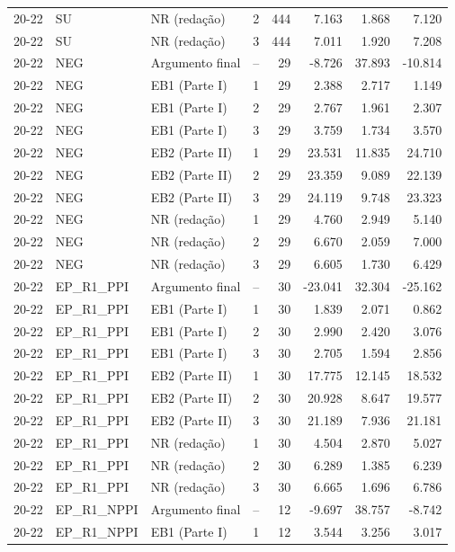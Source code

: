 \begin{longtable}{lllcrrrr}
20-22 & SU & NR (redação) & 2 & 444 & 7.163 & 1.868 & 7.120 \\
20-22 & SU & NR (redação) & 3 & 444 & 7.011 & 1.920 & 7.208 \\
20-22 & NEG & Argumento final & -- & 29 & -8.726 & 37.893 & -10.814 \\
20-22 & NEG & EB1 (Parte I) & 1 & 29 & 2.388 & 2.717 & 1.149 \\
20-22 & NEG & EB1 (Parte I) & 2 & 29 & 2.767 & 1.961 & 2.307 \\
20-22 & NEG & EB1 (Parte I) & 3 & 29 & 3.759 & 1.734 & 3.570 \\
20-22 & NEG & EB2 (Parte II) & 1 & 29 & 23.531 & 11.835 & 24.710 \\
20-22 & NEG & EB2 (Parte II) & 2 & 29 & 23.359 & 9.089 & 22.139 \\
20-22 & NEG & EB2 (Parte II) & 3 & 29 & 24.119 & 9.748 & 23.323 \\
20-22 & NEG & NR (redação) & 1 & 29 & 4.760 & 2.949 & 5.140 \\
20-22 & NEG & NR (redação) & 2 & 29 & 6.670 & 2.059 & 7.000 \\
20-22 & NEG & NR (redação) & 3 & 29 & 6.605 & 1.730 & 6.429 \\
20-22 & EP\_R1\_PPI & Argumento final & -- & 30 & -23.041 & 32.304 & -25.162 \\
20-22 & EP\_R1\_PPI & EB1 (Parte I) & 1 & 30 & 1.839 & 2.071 & 0.862 \\
20-22 & EP\_R1\_PPI & EB1 (Parte I) & 2 & 30 & 2.990 & 2.420 & 3.076 \\
20-22 & EP\_R1\_PPI & EB1 (Parte I) & 3 & 30 & 2.705 & 1.594 & 2.856 \\
20-22 & EP\_R1\_PPI & EB2 (Parte II) & 1 & 30 & 17.775 & 12.145 & 18.532 \\
20-22 & EP\_R1\_PPI & EB2 (Parte II) & 2 & 30 & 20.928 & 8.647 & 19.577 \\
20-22 & EP\_R1\_PPI & EB2 (Parte II) & 3 & 30 & 21.189 & 7.936 & 21.181 \\
20-22 & EP\_R1\_PPI & NR (redação) & 1 & 30 & 4.504 & 2.870 & 5.027 \\
20-22 & EP\_R1\_PPI & NR (redação) & 2 & 30 & 6.289 & 1.385 & 6.239 \\
20-22 & EP\_R1\_PPI & NR (redação) & 3 & 30 & 6.665 & 1.696 & 6.786 \\
20-22 & EP\_R1\_NPPI & Argumento final & -- & 12 & -9.697 & 38.757 & -8.742 \\
20-22 & EP\_R1\_NPPI & EB1 (Parte I) & 1 & 12 & 3.544 & 3.256 & 3.017 \\

\end{longtable}
